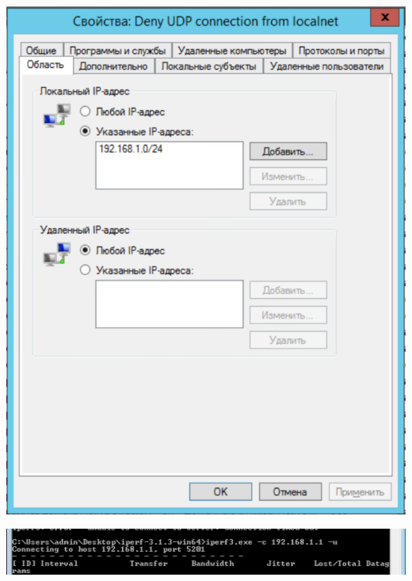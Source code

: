 \documentclass[a4paper,14pt]{extarticle}
\begin{document}
    \begin{center}
        \includegraphics[scale=0.7]{7.4.2.png}
    \end{center}

    \begin{center}
        \includegraphics[scale=0.8]{7.4.3.png}
    \end{center}
\end{document}
